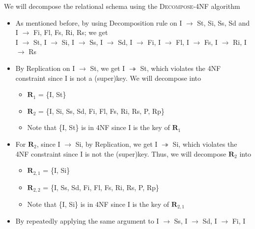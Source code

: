 \documentclass[12pt]{article}
\begin{document}
\begin{enumerate}
        We will decompose the relational schema using the \textsc{Decompose-4NF}
        algorithm
        \begin{itemize}
          \item As mentioned before, by using Decomposition rule on I
                $\longrightarrow$ St, Si, Ss, Sd and I $\longrightarrow$ Fi,
                Fl, Fs, Ri, Rs; we get \\
                I $\longrightarrow$ St, I $\longrightarrow$ Si, I
                $\longrightarrow$ Ss, I $\longrightarrow$ Sd, I
                $\longrightarrow$ Fi, I $\longrightarrow$ Fl, I
                $\longrightarrow$ Fs, I $\longrightarrow$ Ri, I
                $\longrightarrow$ Rs
          \item By Replication on I $\longrightarrow$ St, we get I
                $\twoheadrightarrow$ St, which violates the 4NF constraint since
                I is not a (super)key. We will decompose into
                \begin{itemize}
                  \item $\textbf{R}_1$ = \{I, St\}
                  \item $\textbf{R}_2$ = \{I, Si, Ss, Sd, Fi, Fl, Fs, Ri, Rs, P,
                                          Rp\}
                  \item Note that \{I, St\} is in 4NF since I is the key of
                        $\textbf{R}_1$
                \end{itemize}
          \item For $\textbf{R}_2$, since I $\longrightarrow$ Si, by
                Replication, we get I $\twoheadrightarrow$ Si, which violates
                the 4NF constraint since I is not the (super)key. Thus, we will
                decompose $\textbf{R}_2$ into
                \begin{itemize}
                  \item $\textbf{R}_{2,1}$ = \{I, Si\}
                  \item $\textbf{R}_{2,2}$ = \{I, Ss, Sd, Fi, Fl, Fs, Ri, Rs, P,
                                              Rp\}
                  \item Note that \{I, Si\} is in 4NF since I is the key of
                        $\textbf{R}_{2,1}$
                \end{itemize}
          \item By repeatedly applying the same argument to I $\longrightarrow$
                Ss, I $\longrightarrow$ Sd, I $\longrightarrow$ Fi, I

\end{itemize}
\end{enumerate}
\end{document}
